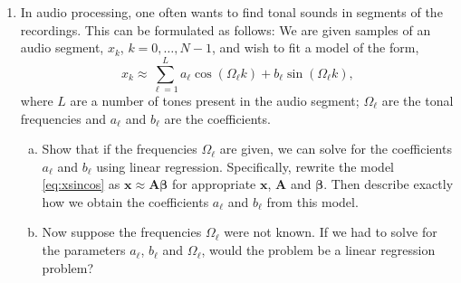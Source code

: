\documentclass[11pt]{article}
\def\beq{\begin{equation}}
\def\eeq{\end{equation}}
\newcommand{\xbf}{\mathbf{x}}
\newcommand{\Abf}{\mathbf{A}}
\def\betabf{{\boldsymbol \beta}}
\begin{document}
\begin{enumerate}
\item In audio processing, one often wants to find tonal sounds in
segments of the recordings.  This can be formulated as follows:
We are given samples of an audio segment,
$x_k$, $k=0,\ldots,N-1$, and wish to fit a model of the form,
\beq \label{eq:xsincos}
    x_k \approx \sum_{\ell = 1}^L a_\ell \cos(\Omega_\ell k) + b_\ell \sin(\Omega_\ell k),
\eeq
where $L$ are a number of tones present in the audio segment;
$\Omega_\ell$ are the tonal frequencies and $a_\ell$ and $b_\ell$ are
the coefficients.
\begin{enumerate}[(a)]
\item Show that if the frequencies $\Omega_\ell$ are given, we can solve
for the coefficients $a_\ell$ and $b_\ell$ using linear regression.
Specifically, rewrite the model \eqref{eq:xsincos} as
$\xbf \approx \Abf\betabf$ for appropriate $\xbf$, $\Abf$ and $\betabf$.
Then describe exactly how we obtain the coefficients $a_\ell$ and $b_\ell$
from this model.

\item Now suppose the frequencies $\Omega_\ell$ were not known.
If we had to solve for the parameters $a_\ell$, $b_\ell$ and $\Omega_\ell$,
would the problem be a linear regression problem?
\end{enumerate}

\end{enumerate}
\end{document}
